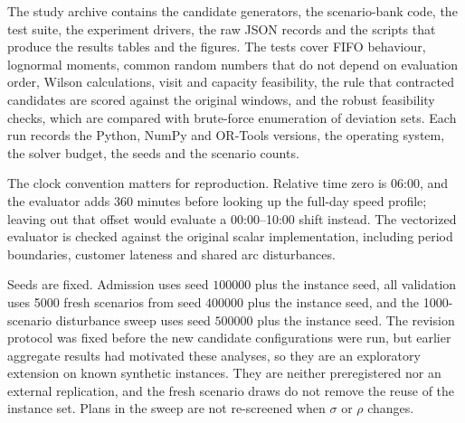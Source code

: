 \documentclass[11pt,a4paper]{article}
\begin{document}
The study archive \cite{ali2026archive} contains the candidate generators, the
scenario-bank code, the test suite, the experiment drivers, the raw JSON records
and the scripts that produce the results tables and the figures. The tests cover
FIFO behaviour, lognormal moments, common random numbers that do not depend on
evaluation order, Wilson calculations, visit and capacity feasibility, the rule
that contracted candidates are scored against the original windows, and the
robust feasibility checks, which are compared with brute-force enumeration of
deviation sets. Each run
records the Python, NumPy and OR-Tools versions, the operating system, the solver
budget, the seeds and the scenario counts.

The clock convention matters for reproduction. Relative time zero is 06:00, and
the evaluator adds 360 minutes before looking up the full-day speed profile;
leaving out that offset would evaluate a 00:00--10:00 shift instead. The
vectorized evaluator is checked against the original scalar implementation,
including period boundaries, customer lateness and shared arc disturbances.

Seeds are fixed. Admission uses seed $100000$ plus the instance seed, all
validation uses 5000 fresh scenarios from seed $400000$ plus the instance seed,
and the 1000-scenario disturbance sweep uses seed $500000$ plus the instance
seed. The revision protocol was fixed before the new candidate configurations
were run, but earlier aggregate results had motivated these analyses, so they are an
exploratory extension on known synthetic instances. They are neither
preregistered nor an external replication, and the fresh scenario draws do not
remove the reuse of the instance set. Plans in the sweep are not re-screened when
$\sigma$ or $\rho$ changes.
\end{document}
